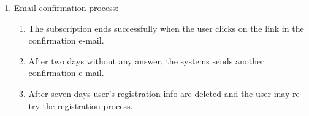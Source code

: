 \begin{enumerate}
    \item Email confirmation process:
    \begin{enumerate}
    \item The subscription ends successfully when the user clicks on the link in the confirmation e-mail.
    \item After two days without any answer, the systems sends another confirmation e-mail.
    \item After seven days user's registration info are deleted and the user may re-try the registration process.
   \end{enumerate}
\end{enumerate}

